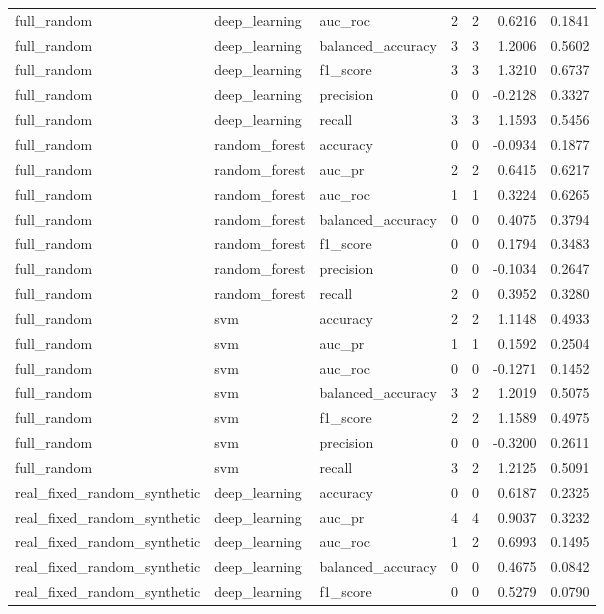 \begin{tabular}{lllllrr}
full_random & deep_learning & auc_roc & 2 & 2 & 0.6216 & 0.1841 \\
full_random & deep_learning & balanced_accuracy & 3 & 3 & 1.2006 & 0.5602 \\
full_random & deep_learning & f1_score & 3 & 3 & 1.3210 & 0.6737 \\
full_random & deep_learning & precision & 0 & 0 & -0.2128 & 0.3327 \\
full_random & deep_learning & recall & 3 & 3 & 1.1593 & 0.5456 \\
full_random & random_forest & accuracy & 0 & 0 & -0.0934 & 0.1877 \\
full_random & random_forest & auc_pr & 2 & 2 & 0.6415 & 0.6217 \\
full_random & random_forest & auc_roc & 1 & 1 & 0.3224 & 0.6265 \\
full_random & random_forest & balanced_accuracy & 0 & 0 & 0.4075 & 0.3794 \\
full_random & random_forest & f1_score & 0 & 0 & 0.1794 & 0.3483 \\
full_random & random_forest & precision & 0 & 0 & -0.1034 & 0.2647 \\
full_random & random_forest & recall & 2 & 0 & 0.3952 & 0.3280 \\
full_random & svm & accuracy & 2 & 2 & 1.1148 & 0.4933 \\
full_random & svm & auc_pr & 1 & 1 & 0.1592 & 0.2504 \\
full_random & svm & auc_roc & 0 & 0 & -0.1271 & 0.1452 \\
full_random & svm & balanced_accuracy & 3 & 2 & 1.2019 & 0.5075 \\
full_random & svm & f1_score & 2 & 2 & 1.1589 & 0.4975 \\
full_random & svm & precision & 0 & 0 & -0.3200 & 0.2611 \\
full_random & svm & recall & 3 & 2 & 1.2125 & 0.5091 \\
real_fixed_random_synthetic & deep_learning & accuracy & 0 & 0 & 0.6187 & 0.2325 \\
real_fixed_random_synthetic & deep_learning & auc_pr & 4 & 4 & 0.9037 & 0.3232 \\
real_fixed_random_synthetic & deep_learning & auc_roc & 1 & 2 & 0.6993 & 0.1495 \\
real_fixed_random_synthetic & deep_learning & balanced_accuracy & 0 & 0 & 0.4675 & 0.0842 \\
real_fixed_random_synthetic & deep_learning & f1_score & 0 & 0 & 0.5279 & 0.0790 \\

\end{tabular}
